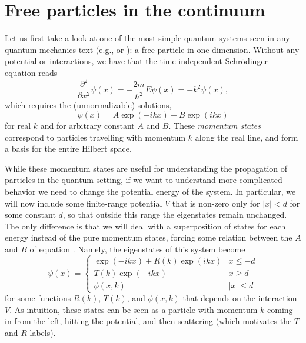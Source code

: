 \documentclass[../thesis-main/thesis-main]{subfiles}
\begin{document}
\section{Free particles in the continuum}

Let us first take a look at one of the most simple quantum systems seen in any quantum mechanics text (e.g., \cite{GriQM} or \cite{SakMQM}): a free particle in one dimension.  Without any potential or interactions, we have that the time independent Schr\"{o}dinger equation reads
\begin{equation}
  \frac{\partial^2}{\partial x^2} \psi(x) = -\frac{2m}{\hbar^2}E \psi(x) = -k^2 \psi(x),
\end{equation}
which requires the (unnormalizable) solutions,
\begin{equation}
  \psi(x) = A \exp(- i k x) + B \exp(i k x) \label{eq:simple_motivating_momentum_states}
\end{equation}
for real $k$ and for arbitrary constant $A$ and $B$.  These \textit{momentum states} correspond to particles travelling with momentum $k$ along the real line, and form a basis for the entire Hilbert space.

While these momentum states are useful for understanding the propagation of particles in the quantum setting, if we want to understand more complicated behavior we need to change the potential energy of the system.  In particular, we will now include some finite-range potential $V$ that is non-zero only for $|x| < d$ for some constant $d$, so that outside this range the eigenstates remain unchanged.  The only difference is that we will deal with a superposition of states for each energy instead of the pure momentum states, forcing some relation between the $A$ and $B$ of equation .  Namely, the eigenstates of this system become
\begin{equation}
  \psi(x) = \begin{cases}
    \exp(-i k x) + R(k) \exp(i k x) & x \leq -d\\
    T(k) \exp(- i k x) & x \geq d\\
    \phi(x,k) & |x| \leq d
    \end{cases}
\end{equation}
for some functions $R(k)$, $T(k)$, and $\phi(x,k)$ that depends on the interaction $V$.  As intuition, these states can be seen as a particle with momentum $k$ coming in from the left, hitting the potential, and then scattering (which motivates the $T$ and $R$ labels).  
\end{document}
